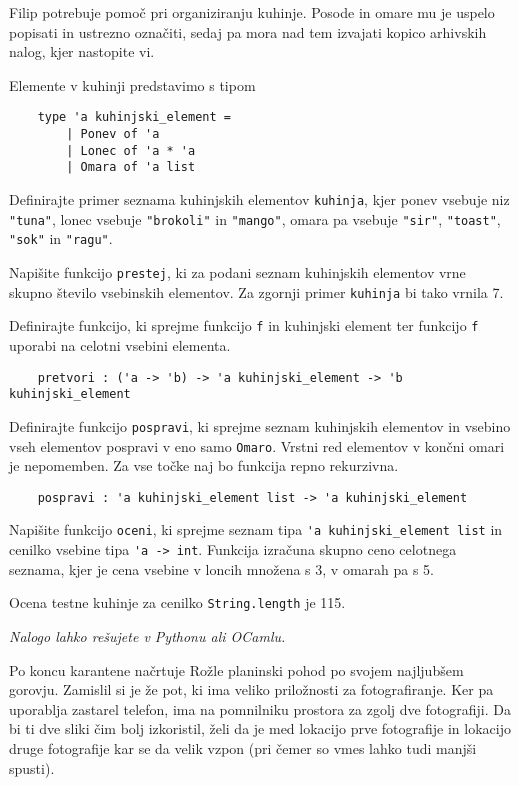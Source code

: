 \documentclass[arhiv]{../izpit}
\begin{document}
Filip potrebuje pomoč pri organiziranju kuhinje. Posode in omare mu je uspelo popisati in ustrezno označiti, sedaj pa mora nad tem izvajati kopico arhivskih nalog, kjer nastopite vi.

Elemente v kuhinji predstavimo s tipom
\begin{verbatim}
    type 'a kuhinjski_element =
        | Ponev of 'a
        | Lonec of 'a * 'a
        | Omara of 'a list
\end{verbatim}

\podnaloga 
Definirajte primer seznama kuhinjskih elementov \verb|kuhinja|, kjer ponev vsebuje niz \verb|"tuna"|, lonec vsebuje \verb|"brokoli"| in \verb|"mango"|, omara pa vsebuje \verb|"sir"|, \verb|"toast"|, \verb|"sok"| in \verb|"ragu"|.

\podnaloga 
Napišite funkcijo \verb|prestej|, ki za podani seznam kuhinjskih elementov vrne skupno število vsebinskih elementov. Za zgornji primer \verb|kuhinja| bi tako vrnila 7.

\podnaloga 
Definirajte funkcijo, ki sprejme funkcijo \verb|f| in kuhinjski element ter funkcijo \verb|f| uporabi na celotni vsebini elementa.
\begin{verbatim}
    pretvori : ('a -> 'b) -> 'a kuhinjski_element -> 'b kuhinjski_element
\end{verbatim}

\podnaloga 
Definirajte funkcijo \verb|pospravi|, ki sprejme seznam kuhinjskih elementov in vsebino vseh elementov pospravi v eno samo \verb|Omaro|. Vrstni red elementov v končni omari je nepomemben. Za vse točke naj bo funkcija repno rekurzivna. 
\begin{verbatim}
    pospravi : 'a kuhinjski_element list -> 'a kuhinjski_element
\end{verbatim}

\podnaloga 
Napišite funkcijo \verb|oceni|, ki sprejme seznam tipa \verb|'a kuhinjski_element list| in cenilko vsebine tipa \verb|'a -> int|. Funkcija izračuna skupno ceno celotnega seznama, kjer je cena vsebine v loncih množena s 3, v omarah pa s 5.

Ocena testne kuhinje za cenilko \verb|String.length| je 115.



\naloga
\emph{Nalogo lahko rešujete v Pythonu ali OCamlu.}

Po koncu karantene načrtuje Rožle planinski pohod po svojem najljubšem gorovju. Zamislil si je že pot, ki ima veliko priložnosti za fotografiranje. Ker pa uporablja zastarel telefon, ima na pomnilniku prostora za zgolj dve fotografiji. Da bi ti dve sliki čim bolj izkoristil, želi da je med lokacijo prve fotografije in lokacijo druge fotografije kar se da velik vzpon (pri čemer so vmes lahko tudi manjši spusti).
\end{document}
